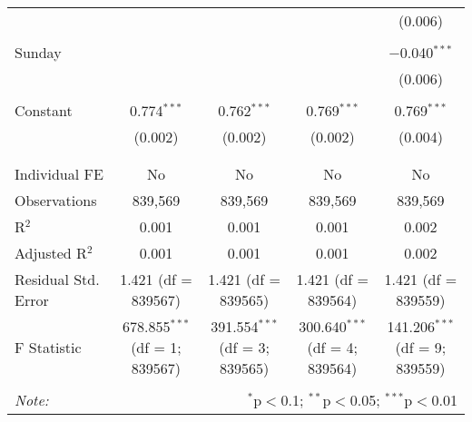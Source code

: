 \documentclass[
]{article}
\begin{document}
\begin{table}[!htbp]
{\begin{tabular}{@{\extracolsep{5pt}}lcccc}
  &  &  &  & (0.006) \\ 
  & & & & \\ 
 Sunday &  &  &  & $-$0.040$^{***}$ \\ 
  &  &  &  & (0.006) \\ 
  & & & & \\ 
 Constant & 0.774$^{***}$ & 0.762$^{***}$ & 0.769$^{***}$ & 0.769$^{***}$ \\ 
  & (0.002) & (0.002) & (0.002) & (0.004) \\ 
  & & & & \\ 
\hline \\[-1.8ex] 
Individual FE & No & No & No & No \\ 
Observations & 839,569 & 839,569 & 839,569 & 839,569 \\ 
R$^{2}$ & 0.001 & 0.001 & 0.001 & 0.002 \\ 
Adjusted R$^{2}$ & 0.001 & 0.001 & 0.001 & 0.002 \\ 
Residual Std. Error & 1.421 (df = 839567) & 1.421 (df = 839565) & 1.421 (df = 839564) & 1.421 (df = 839559) \\ 
F Statistic & 678.855$^{***}$ (df = 1; 839567) & 391.554$^{***}$ (df = 3; 839565) & 300.640$^{***}$ (df = 4; 839564) & 141.206$^{***}$ (df = 9; 839559) \\ 
\hline 
\hline \\[-1.8ex] 
\textit{Note:}  & \multicolumn{4}{r}{$^{*}$p$<$0.1; $^{**}$p$<$0.05; $^{***}$p$<$0.01} \\ 
\end{tabular}
} 
\end{table} 
\newpage
\end{document}
